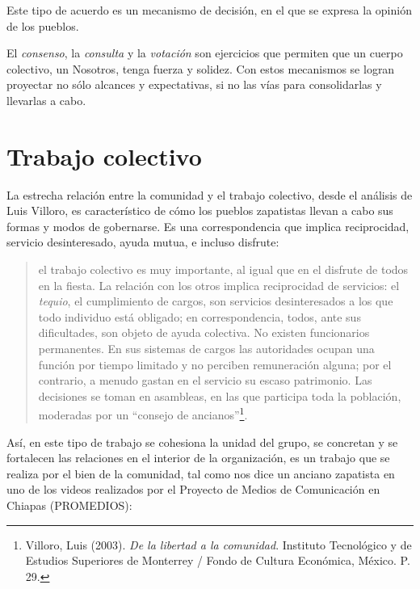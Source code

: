 \documentclass[oneside]{book}
\begin{document}
Este tipo de acuerdo es un mecanismo de decisión, en el que se expresa la opinión de los pueblos.

El \textit{consenso}, la \textit{consulta} y la \textit{votación} son ejercicios que permiten  que un cuerpo colectivo, un Nosotros, tenga fuerza y solidez. Con estos mecanismos se logran proyectar no sólo alcances y expectativas, si no las vías para consolidarlas y llevarlas a cabo.
	
\section{Trabajo colectivo}

La estrecha relación entre la comunidad y el trabajo colectivo, desde el análisis de Luis Villoro, es característico de cómo los pueblos zapatistas llevan a cabo sus formas y modos de gobernarse. Es una correspondencia que implica reciprocidad, servicio desinteresado, ayuda mutua, e incluso disfrute:
\begin{quote}
el trabajo colectivo es muy importante, al igual que en el disfrute de todos en la fiesta. La relación con los otros implica reciprocidad de servicios: el \textit{tequio}, el cumplimiento de cargos, son servicios desinteresados a los que todo individuo está obligado; en correspondencia, todos, ante sus dificultades, son objeto de ayuda colectiva. No existen funcionarios permanentes. En sus sistemas de cargos las autoridades ocupan una función por tiempo limitado y no perciben remuneración alguna; por el contrario, a menudo gastan en el servicio su escaso patrimonio. Las decisiones se toman en asambleas, en las que participa toda la población, moderadas por un “consejo de ancianos”\footnote{Villoro, Luis (2003). \textit{De la libertad a la comunidad}. Instituto Tecnológico y de Estudios Superiores de Monterrey / Fondo de Cultura Económica, México. P. 29.}.
\end{quote}

Así, en este tipo de trabajo se cohesiona la unidad del grupo, se concretan y se fortalecen las relaciones en el interior de la organización, es un trabajo que se realiza por el bien de la comunidad, tal como nos dice un anciano zapatista en uno de los videos realizados por el Proyecto de Medios de Comunicación en Chiapas (PROMEDIOS): 
\end{document}
